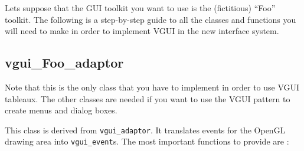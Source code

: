 \documentclass[12pt]{report} \usepackage{epsfig}
\begin{document}
Lets suppose that the GUI toolkit you want to use is the (fictitious) ``Foo'' toolkit.  
The following is a step-by-step guide to all the classes and functions you will need to 
make in order to implement VGUI in the new interface system.
 
\subsection{vgui\_Foo\_adaptor}

Note that this is the only class that you have to implement in order to use VGUI tableaux.
The other classes are needed if you want to use the VGUI pattern to create menus and dialog 
boxes.

This class is derived from {\tt vgui\_adaptor}.  It translates events for the OpenGL drawing 
area into {\tt vgui\_event}s. The most important functions to provide are :
\end{document}
